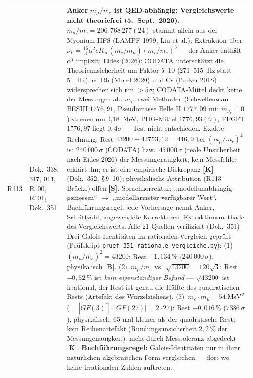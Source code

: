 \begin{longtable}{@{}p{0.9cm}p{3.1cm}p{10.2cm}@{}}
R113 & Dok.~338, 317, 011, R100, R101; Dok.~351 & \textbf{Anker $m_\mu/m_e$ ist QED-abhängig; Vergleichswerte nicht theoriefrei \QM{} (5.~Sept.~2026).} $m_\mu/m_e=206{,}768\,277(24)$ stammt allein aus der Myonium-HFS (LAMPF 1999, Liu et al.); Extraktion über $\nu_F=\tfrac{16}{3}\alpha^2cR_\infty(m_e/m_\mu)(m_r/m_e)^3$ --- der Anker enthält $\alpha^2$ implizit; Eides (2026): CODATA unterschätzt die Theorieunsicherheit um Faktor 5--10 (271--515~Hz statt 51~Hz). $\alpha$: Rb (Morel 2020) und Cs (Parker 2018) widersprechen sich um $>5\sigma$; CODATA-Mittel deckt keine der Messungen ab. $m_\tau$: zwei Methoden (Schwellenscan BESIII $1776{,}91$, Pseudomasse Belle II $1777{,}09$ mit $m_{\nu_\tau}=0$) streuen um 0{,}18~MeV; PDG-Mittel $1776{,}93(9)$, FFGFT $1776{,}97$ liegt $0{,}4\sigma$ --- Test nicht entschieden. Exakte Rechnung: Rest $43200-42753{,}12=446{,}9$ bei $(m_\mu/m_e)^2$ ist $240\,000\,\sigma$ (CODATA) bzw.\ $45\,000\,\sigma$ (reale Unsicherheit nach Eides 2026) der Messungenauigkeit; kein Messfehler erklärt ihn; er ist eine empirische Diskrepanz \textbf{[K]} (Dok.~352, §\,9--10); physikalische Attribution (R113-Brücke) offen \textbf{[S]}. Sprachkorrektur: ,,modellunabhängig gemessen`` $\to$ ,,modellärmster verfügbarer Wert``. Buchführungsregel: jede Vorhersage nennt Anker, Schrittzahl, angewendete Korrekturen, Extraktionsmethode des Vergleichswerts. Alle 21 Quellen verifiziert (Dok.~351) Drei Galois-Identitäten im rationalen Vergleich geprüft (Prüfskript \texttt{pruef\_351\_rationale\_vergleiche.py}): (1)~$(m_\mu/m_e)^2=43200$: Rest $-1{,}034\,\%$ ($240\,000\,\sigma$), physikalisch \textbf{[B]}. (2)~$m_\mu/m_e$ vs.\ $\sqrt{43200}=120\sqrt{3}$: Rest $-0{,}52\,\%$ ist \emph{kein eigenständiger Befund} --- $\sqrt{43200}$ ist irrational, der Rest ist genau die Hälfte des quadratischen Rests (Artefakt des Wurzelziehens). (3)~$m_e\cdot m_\mu=54~\text{MeV}^2$ ($=|GF(3)^*|\cdot|GF(27)|=2\cdot27$): Rest $-0{,}016\,\%$ ($7386\,\sigma$), physikalisch, 65-mal kleiner als der quadratische Rest; kein Rechenartefakt (Rundungsunsicherheit $2{,}2\,\%$ der Messungenauigkeit), nicht durch Messtoleranz abgedeckt \textbf{[K]}. \textbf{Buchführungsregel:} Galois-Identitäten nur in ihrer natürlichen algebraischen Form vergleichen --- dort wo keine irrationalen Zahlen auftreten. \\

\end{longtable}
